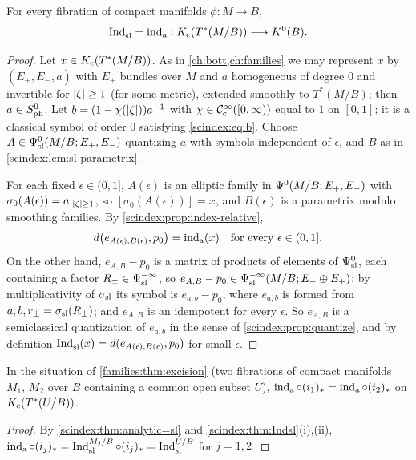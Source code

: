\begin{theorem}\label{scindex:thm:analytic=sl}
  For every fibration of compact manifolds $\phi:M\to B$,
  \begin{equation*}
    \operatorname{Ind}^{}_{\mathrm{sl}}=\operatorname{ind}_{\mathrm{a}}:K_{\mathrm{c}}(T^*(M/B))\longrightarrow K^0(B).
  \end{equation*}
\end{theorem}
\begin{proof}
  Let $x\in K_{\mathrm{c}}(T^*(M/B))$. As in \cref{ch:bott,ch:families} we may represent $x$
  by $(E_+,E_-,a)$ with $E_\pm$ bundles over $M$ and $a$ homogeneous of degree $0$
  and invertible for $\lvert \zeta\rvert\ge1$ (for some metric), extended smoothly to
  $T^*(M/B)$; then $a\in S^{0}_{\mathrm{ph}}$. Let $b=(1-\chi(\lvert \zeta\rvert))a^{-1}$ with
  $\chi\in\mathcal{C}^\infty_{\mathrm{c}}([0,\infty))$ equal to $1$ on $[0,1]$; it is a classical symbol of
  order $0$ satisfying \eqref{scindex:eq:b}. Choose $A\in\Psi^{0}_{\mathrm{sl}}(M/B;E_+,E_-)$
  quantizing $a$ with symbols independent of $\epsilon$, and $B$ as in \cref{scindex:lem:sl-parametrix}.

  For each fixed $\epsilon\in(0,1]$, $A(\epsilon)$ is an elliptic family in
  $\Psi^{0}(M/B;E_+,E_-)$ with $\sigma_0(A(\epsilon))=a|_{\lvert \zeta\rvert\ge1}$, so
  $[\sigma_0(A(\epsilon))]=x$, and $B(\epsilon)$ is a parametrix modulo smoothing
  families. By \cref{scindex:prop:index-relative},
  \begin{equation*}
    d\bigl(e_{A(\epsilon),B(\epsilon)},p_0\bigr)=\operatorname{ind}_{\mathrm{a}}(x)\quad\text{for every
    }\epsilon\in(0,1].
  \end{equation*}
  On the other hand, $e_{A,B}-p_0$ is a matrix of products of elements of
  $\Psi^{0}_{\mathrm{sl}}$, each containing a factor $R_\pm\in\Psi^{-\infty}_{\mathrm{sl}}$, so
  $e_{A,B}-p_0\in\Psi^{-\infty}_{\mathrm{sl}}(M/B;E_-\oplus E_+)$; by multiplicativity of
  $\sigma_{\mathrm{sl}}$ its symbol is $e_{a,b}-p_0$, where $e_{a,b}$ is formed from
  $a,b,r_\pm=\sigma_{\mathrm{sl}}(R_\pm)$; and $e_{A,B}$ is an idempotent for every $\epsilon$.
  So $e_{A,B}$ is a semiclassical quantization of $e_{a,b}$ in the sense of
  \cref{scindex:prop:quantize}, and by definition $\operatorname{Ind}^{}_{\mathrm{sl}}(x)=
  d(e_{A(\epsilon),B(\epsilon)},p_0)$ for small $\epsilon$.
\end{proof}

\begin{corollary}\label{scindex:cor:excision}
  In the situation of \cref{families:thm:excision} (two fibrations
  of compact manifolds $M_1$, $M_2$ over $B$ containing a common open subset $U$),
  $\operatorname{ind}_{\mathrm{a}}\circ(i_1)_*=\operatorname{ind}_{\mathrm{a}}\circ(i_2)_*$ on $K_{\mathrm{c}}(T^*(U/B))$.
\end{corollary}
\begin{proof}
  By \cref{scindex:thm:analytic=sl} and \cref{scindex:thm:Indsl}(i),(ii),
  $\operatorname{ind}_{\mathrm{a}}\circ(i_j)_*=\operatorname{Ind}^{M_j/B}_{\mathrm{sl}}\circ(i_j)_*=\operatorname{Ind}^{U/B}_{\mathrm{sl}}$ for $j=1,2$.
\end{proof}

